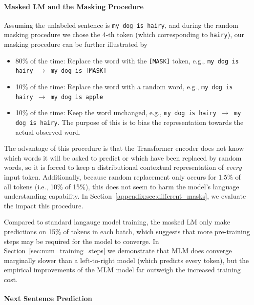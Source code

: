 \documentclass[11pt,a4paper]{article}
\begin{document}
\paragraph{Masked LM and the Masking Procedure} 

Assuming the unlabeled sentence is {\tt {\small my dog is hairy}}, 
and during the random masking procedure we chose the 4-th token (which corresponding to {\tt {\small hairy}}), our masking procedure
can be further illustrated by
\begin{itemize}
\item 80\% of the time: Replace the word with the {\tt [MASK]} token, e.g., {\tt {\small my dog is hairy $\rightarrow$ my dog is [MASK]}}
\item 10\% of the time: Replace the word with a random word, e.g., {\tt {\small my dog is hairy $\rightarrow$ my dog is apple}}
\item 10\% of the time: Keep the word unchanged, e.g., {\tt {\small my dog is hairy $\rightarrow$ my dog is hairy}}. The purpose of this is to bias the representation towards the actual observed word.
\end{itemize}

The advantage of this procedure is that the Transformer encoder does not know which words it will be asked to predict or which have been replaced by random words, so it is forced to keep a distributional contextual representation of {\it every} input token. Additionally, because random replacement only occurs for 1.5\% of all tokens (i.e., 10\% of 15\%), this does not seem to harm the model's language understanding capability. In Section~\ref{appendix:sec:different_masks},
we evaluate the impact this procedure.

Compared to standard langauge model training, the masked LM only
make predictions on 15\% of tokens in each batch, which suggests that more pre-training steps may be required for the model to converge. In Section~\ref{sec:num_training_steps} we demonstrate that MLM does converge marginally slower than a left-to-right model (which predicts every token), but the empirical improvements of the MLM model far outweigh the increased training cost.

\paragraph{Next Sentence Prediction} 
\end{document}
